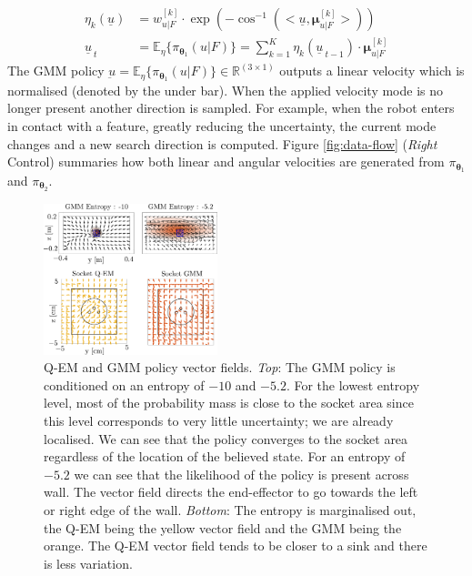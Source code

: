 \documentclass[final,5p,times,twocolumn]{elsarticle}
\newcommand{\MuK}{\boldsymbol{\mu}^{[k]}}
\newcommand{\xb}{u|F}
\newcommand{\Param}{\boldsymbol{\theta}}
\begin{document}
\begin{align}
 \eta_k(\underline{u}) &= w^{[k]}_{\xb} \cdot \exp(-\cos^{-1}(<\underline{u},\MuK_{\xb}>)) \label{eq:alpha_eq}\\
 \underline{u}_{\:t} &= \mathbb{E}_{\eta}\{\pi_{\Param_1}(\xb)\} = \sum_{k=1}^K \eta_k(\underline{u}_{\:t-1}) \cdot \MuK_{\xb} \label{eq:alpha_expectation}
\end{align}
The GMM policy $\underbar{u} = \mathbb{E}_{\eta}\{\pi_{\Param_1}(u \lvert F)\} \in \mathbb{R}^{(3 \times 1)}$ outputs a linear velocity which 
is normalised (denoted by the under bar). When the applied velocity mode is no longer present another direction is sampled. 
For example, when the robot enters in contact with a feature, greatly reducing the uncertainty, the current mode changes and a 
new search direction is computed. Figure \ref{fig:data-flow} (\textit{Right} Control) summaries how both linear and angular 
velocities are generated from $\pi_{\Param_1}$ and $\pi_{\Param_2}$.

\begin{figure}
   \includegraphics[width=0.45\textwidth]{./Figures/Fig/policy_vf.pdf}
  \caption{Q-EM and GMM policy vector fields. \textit{Top}: The GMM policy is conditioned on an entropy of $-10$ and $-5.2$. For the lowest entropy level,
  most of the probability mass is close to the socket area since this level corresponds to very little uncertainty; we are already localised. We can see 
  that the policy converges to the socket area regardless of the location of the believed state. For an entropy of $-5.2$ we can see that 
  the likelihood of the policy is present across wall. The vector field directs the end-effector to go towards the left or right edge of the wall. 
  \textit{Bottom}: The entropy is marginalised out, the Q-EM being the yellow vector field and the GMM being the orange.
  The Q-EM vector field tends to be closer to a sink and there is less variation.}
  \label{fig:policy_vf}
\end{figure}
\end{document}
